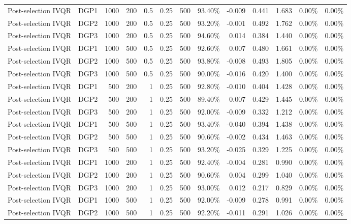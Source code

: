 \begin{landscape}
\begin{longtable}{llrrrrrrrrrrr}
Post-selection IVQR & DGP1 & 1000 & 200 & 0.5 & 0.25 & 500 & 93.40\% & -0.009 & 0.441 & 1.683 & 0.00\% & 0.00\% \\
Post-selection IVQR & DGP2 & 1000 & 200 & 0.5 & 0.25 & 500 & 93.20\% & -0.001 & 0.492 & 1.762 & 0.00\% & 0.00\% \\
Post-selection IVQR & DGP3 & 1000 & 200 & 0.5 & 0.25 & 500 & 94.60\% & 0.014 & 0.384 & 1.440 & 0.00\% & 0.00\% \\
Post-selection IVQR & DGP1 & 1000 & 500 & 0.5 & 0.25 & 500 & 92.60\% & 0.007 & 0.480 & 1.661 & 0.00\% & 0.00\% \\
Post-selection IVQR & DGP2 & 1000 & 500 & 0.5 & 0.25 & 500 & 93.80\% & -0.008 & 0.493 & 1.805 & 0.00\% & 0.00\% \\
Post-selection IVQR & DGP3 & 1000 & 500 & 0.5 & 0.25 & 500 & 90.00\% & -0.016 & 0.420 & 1.400 & 0.00\% & 0.00\% \\
Post-selection IVQR & DGP1 & 500 & 200 & 1 & 0.25 & 500 & 92.80\% & -0.010 & 0.404 & 1.428 & 0.00\% & 0.00\% \\
Post-selection IVQR & DGP2 & 500 & 200 & 1 & 0.25 & 500 & 89.40\% & 0.007 & 0.429 & 1.445 & 0.00\% & 0.00\% \\
Post-selection IVQR & DGP3 & 500 & 200 & 1 & 0.25 & 500 & 92.00\% & -0.009 & 0.332 & 1.212 & 0.00\% & 0.00\% \\
Post-selection IVQR & DGP1 & 500 & 500 & 1 & 0.25 & 500 & 93.40\% & -0.040 & 0.394 & 1.438 & 0.00\% & 0.00\% \\
Post-selection IVQR & DGP2 & 500 & 500 & 1 & 0.25 & 500 & 90.60\% & -0.002 & 0.434 & 1.463 & 0.00\% & 0.00\% \\
Post-selection IVQR & DGP3 & 500 & 500 & 1 & 0.25 & 500 & 93.20\% & -0.025 & 0.329 & 1.225 & 0.00\% & 0.00\% \\
Post-selection IVQR & DGP1 & 1000 & 200 & 1 & 0.25 & 500 & 92.40\% & -0.004 & 0.281 & 0.990 & 0.00\% & 0.00\% \\
Post-selection IVQR & DGP2 & 1000 & 200 & 1 & 0.25 & 500 & 90.60\% & 0.004 & 0.299 & 1.040 & 0.00\% & 0.00\% \\
Post-selection IVQR & DGP3 & 1000 & 200 & 1 & 0.25 & 500 & 93.00\% & 0.012 & 0.217 & 0.829 & 0.00\% & 0.00\% \\
Post-selection IVQR & DGP1 & 1000 & 500 & 1 & 0.25 & 500 & 92.00\% & -0.009 & 0.278 & 0.991 & 0.00\% & 0.00\% \\
Post-selection IVQR & DGP2 & 1000 & 500 & 1 & 0.25 & 500 & 92.20\% & -0.011 & 0.291 & 1.026 & 0.00\% & 0.00\% \\

\end{longtable}
\end{landscape}
